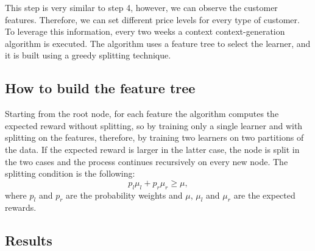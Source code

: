 This step is very similar to step 4, however, we can observe the customer features.
Therefore, we can set different price levels for every type of customer.
To leverage this information, every two weeks a context context-generation algorithm is executed.
The algorithm uses a feature tree to select the learner, and it is built using a greedy splitting technique.

\subsection{How to build the feature tree}
Starting from the root node, for each feature the algorithm computes the expected reward without splitting, so by training only a single learner and with splitting on the features, therefore, by training two learners on two partitions of the data.
If the expected reward is larger in the latter case, the node is split in the two cases and the process continues recursively on every new node.
The splitting condition is the following:
\begin{equation}
    p_l\mu_l + p_r \mu_r \geq \mu,
\end{equation}
where $p_l$ and $p_r$ are the probability weights and $\mu$, $\mu_l$ and $\mu_r$ are the expected rewards.

\subsection{Results}
